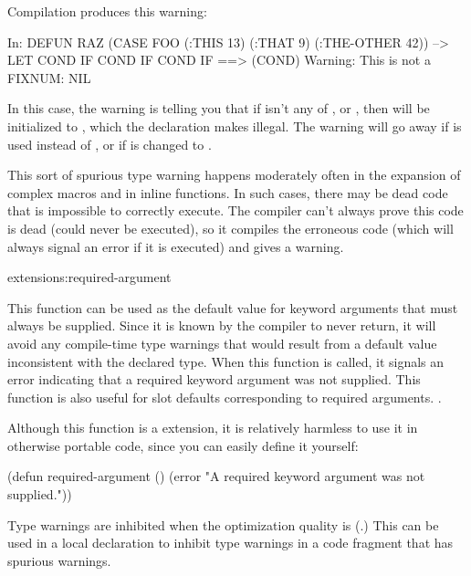 Compilation produces this warning:

\begin{example}
In: DEFUN RAZ
  (CASE FOO (:THIS 13) (:THAT 9) (:THE-OTHER 42))
--> LET COND IF COND IF COND IF 
==>
  (COND)
Warning: This is not a FIXNUM:
  NIL
\end{example}

In this case, the warning is telling you that if  isn't any
of ,  or , then  will be
initialized to \false, which the  declaration makes
illegal.  The warning will go away if  is used instead of
, or if  is changed to \true.

This sort of spurious type warning happens moderately often in the
expansion of complex macros and in inline functions.  In such cases,
there may be dead code that is impossible to correctly execute.  The
compiler can't always prove this code is dead (could never be
executed), so it compiles the erroneous code (which will always signal
an error if it is executed) and gives a warning.

\begin{defun}{extensions:}{required-argument}{}
  
  This function can be used as the default value for keyword arguments
  that must always be supplied.  Since it is known by the compiler to
  never return, it will avoid any compile-time type warnings that
  would result from a default value inconsistent with the declared
  type.  When this function is called, it signals an error indicating
  that a required keyword argument was not supplied.  This function is
  also useful for  slot defaults corresponding to
  required arguments.  .
  
  Although this function is a \cmucl{} extension, it is relatively harmless
  to use it in otherwise portable code, since you can easily define it
  yourself:
  \begin{lisp}
    (defun required-argument ()
      (error "A required keyword argument was not supplied."))
    \end{lisp}
\end{defun}

Type warnings are inhibited when the
 optimization quality is 
(.)  This can be used in a local declaration
to inhibit type warnings in a code fragment that has spurious
warnings.


